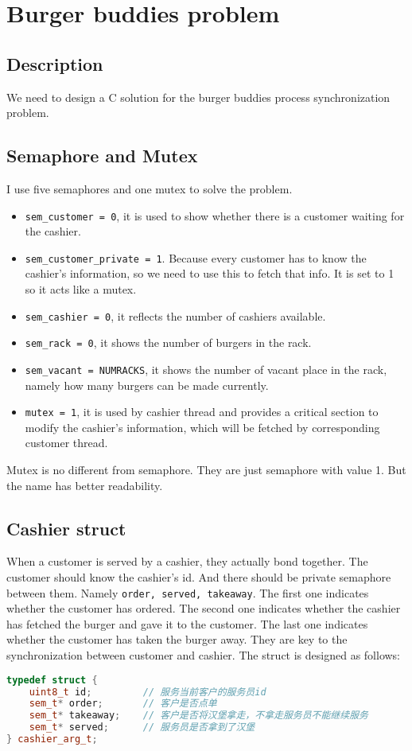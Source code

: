 \section{Burger buddies problem} 
\subsection{Description}
We need to design a C solution for the burger buddies process synchronization problem. 

\subsection{Semaphore and Mutex}
I use five semaphores and one mutex to solve the problem. 
\begin{itemize}
    \item \texttt{sem\_customer = 0}, it is used to show whether there is a customer waiting for the cashier.
    \item \texttt{sem\_customer\_private = 1}. Because every customer has to know the cashier's information, so we need to use this to fetch that info. It is set to 1 so it acts like a mutex.
    \item \texttt{sem\_cashier = 0}, it reflects the number of cashiers available.
    \item \texttt{sem\_rack = 0}, it shows the number of burgers in the rack.
    \item \texttt{sem\_vacant = NUMRACKS}, it shows the number of vacant place in the rack, namely how many burgers can be made currently.
    \item \texttt{mutex = 1}, it is used by cashier thread and provides a critical section to modify the cashier's information, which will be fetched by corresponding customer thread.
\end{itemize}

Mutex is no different from semaphore. They are just semaphore with value 1. But the name has better readability.

\subsection{Cashier struct}
When a customer is served by a cashier, they actually bond together. The customer
should know the cashier's id. And there should be private semaphore between them. Namely 
\texttt{order, served, takeaway}. The first one indicates whether the customer has 
ordered. The second one indicates whether the cashier has fetched the burger and gave it to the customer. The last one indicates whether the customer has taken the burger away.
They are key to the synchronization between customer and cashier. The struct is designed as follows:
\begin{lstlisting}[language=C++]
typedef struct {
    uint8_t id;         // 服务当前客户的服务员id
    sem_t* order;       // 客户是否点单
    sem_t* takeaway;    // 客户是否将汉堡拿走，不拿走服务员不能继续服务
    sem_t* served;      // 服务员是否拿到了汉堡
} cashier_arg_t;
\end{lstlisting}

